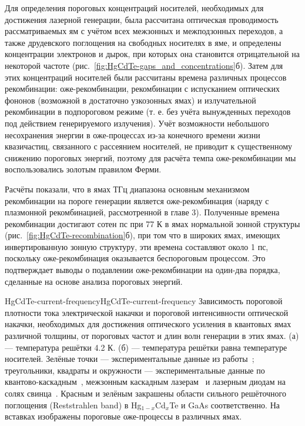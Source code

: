 Для определения пороговых концентраций носителей, необходимых для достижения лазерной генерации, была рассчитана оптическая проводимость рассматриваемых ям с учётом всех межзонных и межподзонных переходов, а также друдевского поглощения на свободных носителях в яме, и определены концентрации электронов и дырок, при которых она становится отрицательной на некоторой частоте (рис.~\ref{fig:HgCdTe-gaps_and_concentrations}б). Затем для этих концентраций носителей были рассчитаны времена различных процессов рекомбинации: оже-рекомбинации, рекомбинации с испусканием оптических фононов (возможной в достаточно узкозонных ямах) и излучательной рекомбинации в подпороговом режиме (т. е. без учёта вынужденных переходов под действием генерируемого излучения). Учёт возможности небольшого несохранения энергии в оже-процессах из-за конечного времени жизни квазичастиц, связанного с рассеянием носителей, не приводит к существенному снижению пороговых энергий, поэтому для расчёта темпа оже-рекомбинации мы воспользовались золотым правилом Ферми.

Расчёты показали, что в ямах ТГц диапазона основным механизмом рекомбинации на пороге генерации является оже-рекомбинация (наряду с плазмонной рекомбинацией, рассмотренной в главе 3). Полученные времена рекомбинации достигают сотен пс при 77 К в ямах нормальной зонной структуры (рис.~\ref{fig:HgCdTe-recombination}б), при том что в широких ямах, имеющих инвертированную зонную структуру, эти времена составляют около 1 пс, поскольку оже-рекомбинация оказывается беспороговым процессом. Это подтверждает выводы о подавлении оже-рекомбинации на один-два порядка, сделанные на основе анализа пороговых энергий.

\begin{fig}{HgCdTe-current-frequency}{HgCdTe-current-frequency} Зависимость пороговой плотности тока электрической накачки и пороговой интенсивности оптической накачки, необходимых для достижения оптического усиления в квантовых ямах \HgCdTe{} различной толщины, от пороговых частот и длин волн генерации в этих ямах. (а) --- температура решётки 4.2 К. (б) --- температура решётки равна температуре носителей.  Зелёные точки --- экспериментальные данные из работы~\cite{HgCdTe-stimulated_emission}; треугольники, квадраты и окружности --- экспериментальные данные по квантово-каскадным~\cite{QCL_5.1um_300K,QCL_7.66um_300K,QCL_15.1um_300K,QCL_17.8um_77K,QCL_24.5um_77K}, межзонным каскадным лазерам~\cite{ICL_3.67um_300K,ICL_6um_300K,ICL_7um_300K,ICL_10.4um_77K} и лазерным диодам на солях свинца~\cite{LeadSalt_DoubleHeterostructure,Lead_Salt_LaserCharacteristics}. Красным и зелёным закрашены области сильного решёточного поглощения (Reststrahlen band) в Hg$_{1-x}$Cd$_{x}$Te и GaAs соответственно. На вставках изображены пороговые оже-процессы в различных ямах.
\end{fig}


